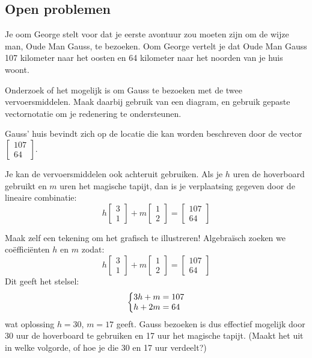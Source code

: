 \documentclass{ximera}
\begin{document}
\subsection*{Open problemen}
\begin{exercise}
Je oom George stelt voor dat je eerste avontuur zou moeten zijn om de wijze man, Oude Man Gauss, te bezoeken.
Oom George vertelt je dat Oude Man Gauss 107 kilometer naar het oosten en 64 kilometer naar het noorden van je huis woont.\newline

Onderzoek of het mogelijk is om Gauss te bezoeken met de twee vervoersmiddelen.
Maak daarbij gebruik van een diagram, en gebruik gepaste vectornotatie om je redenering te ondersteunen.
\begin{hint}
Gauss' huis bevindt zich op de locatie die kan worden beschreven door de vector $\begin{bmatrix} 107 \\ 64 \end{bmatrix}$.
\end{hint}
\begin{hint}
Je kan de vervoersmiddelen ook achteruit gebruiken.
Als je \(h\) uren de hoverboard gebruikt en \(m\) uren het magische tapijt, dan is je verplaatsing gegeven door de lineaire combinatie:
\[h \begin{bmatrix} 3 \\ 1 \end{bmatrix} + m \begin{bmatrix} 1 \\ 2 \end{bmatrix} = \begin{bmatrix} 107 \\ 64 \end{bmatrix}\]
\end{hint}
\begin{oplossing}
Maak zelf een tekening om het grafisch te illustreren!
Algebraïsch zoeken we coëfficiënten \(h\) en \(m\) zodat:
\[h \begin{bmatrix} 3 \\ 1 \end{bmatrix} + m \begin{bmatrix} 1 \\ 2 \end{bmatrix} = \begin{bmatrix} 107 \\ 64 \end{bmatrix}\]
Dit geeft het stelsel:
\[
\left\{
    \begin{array}{@{}l@{}}
    3h+m=107\\
    h+2m=64
    \end{array}
\right.
\]
wat oplossing \(h=30\), \(m=17\) geeft.
Gauss bezoeken is dus effectief mogelijk door 30 uur de hoverboard te gebruiken en 17 uur het magische tapijt.
(Maakt het uit in welke volgorde, of hoe je die 30 en 17 uur verdeelt?)
\end{oplossing}
\end{exercise}
\end{document}

